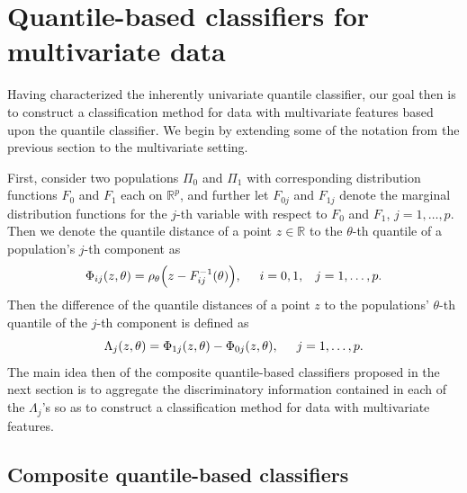 
\section{Quantile-based classifiers for multivariate data}
\label{sec:multivariate-classifier}

Having characterized the inherently univariate quantile classifier, our goal
then is to construct a classification method for data with multivariate features
based upon the quantile classifier.  We begin by extending some of the notation
from the previous section to the multivariate setting.

First, consider two populations $\Pi_0$ and $\Pi_1$ with corresponding
distribution functions $F_0$ and $F_1$ each on $\mathbb{R}^{p}$, and further let
$F_{0j}$ and $F_{1j}$ denote the marginal distribution functions for the $j$-th
variable with respect to $F_0$ and $F_1$, $j = 1, \dots, p$.  Then we denote the
quantile distance of a point $z \in \mathbb{R}$ to the $\theta$-th quantile of a
population's $j$-th component as
\begin{equation}
  \label{eq:multivariate-phi}
  \Phi_{ij}(z, \theta) =
  \rho_{\theta}\Big(z - F_{ij}^{-1}(\theta) \Big),
  \hspace{5mm} i = 0, 1, \hspace{3mm} j = 1, \dots, p.
\end{equation}
Then the difference of the quantile distances of a point $z$ to the populations'
$\theta$-th quantile of the $j$-th component is defined as
\begin{equation}
  \Lambda_j (z, \theta) = \Phi_{1j}(z, \theta) - \Phi_{0j}(z, \theta),
  \hspace{5mm} j = 1, \dots, p.
\end{equation}
The main idea then of the composite quantile-based classifiers proposed in the
next section is to aggregate the discriminatory information contained in each of
the $\Lambda_j$'s so as to construct a classification method for data with
multivariate features.


\subsection{Composite quantile-based classifiers}
\label{sec:varying-coefficient}

